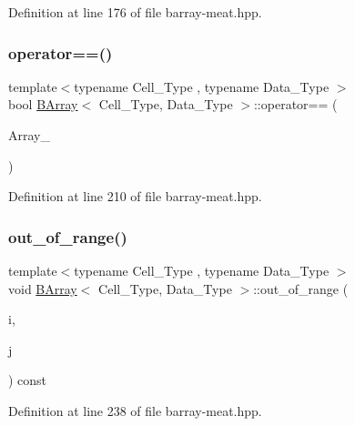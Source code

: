 Definition at line 176 of file barray-\/meat.\+hpp.

\mbox{\label{class_b_array_a1e6e18162202b06e19f214097eb993bf}} 
\subsubsection{\texorpdfstring{operator==()}{operator==()}}
{\footnotesize\ttfamily template$<$typename Cell\+\_\+\+Type , typename Data\+\_\+\+Type $>$ \\
bool \hyperlink{class_b_array}{B\+Array}$<$ Cell\+\_\+\+Type, Data\+\_\+\+Type $>$\+::operator== (\begin{DoxyParamCaption}\item[{const \hyperlink{class_b_array}{B\+Array}$<$ Cell\+\_\+\+Type, Data\+\_\+\+Type $>$ \&}]{Array\+\_\+ }\end{DoxyParamCaption})\hspace{0.3cm}{\ttfamily [inline]}}



Definition at line 210 of file barray-\/meat.\+hpp.

\mbox{\label{class_b_array_a87bad4dcad82009d5721d21808b7e469}} 
\subsubsection{\texorpdfstring{out\+\_\+of\+\_\+range()}{out\_of\_range()}}
{\footnotesize\ttfamily template$<$typename Cell\+\_\+\+Type , typename Data\+\_\+\+Type $>$ \\
void \hyperlink{class_b_array}{B\+Array}$<$ Cell\+\_\+\+Type, Data\+\_\+\+Type $>$\+::out\+\_\+of\+\_\+range (\begin{DoxyParamCaption}\item[{\hyperlink{typedefs_8hpp_a91ad9478d81a7aaf2593e8d9c3d06a14}{uint}}]{i,  }\item[{\hyperlink{typedefs_8hpp_a91ad9478d81a7aaf2593e8d9c3d06a14}{uint}}]{j }\end{DoxyParamCaption}) const\hspace{0.3cm}{\ttfamily [inline]}}



Definition at line 238 of file barray-\/meat.\+hpp.

